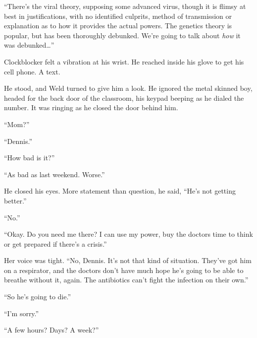 ``There's the viral theory, supposing some advanced virus, though it is flimsy at best in justifications, with no identified culprits, method of transmission or explanation as to how it provides the actual powers.  The genetics theory is popular, but has been thoroughly debunked.  We're going to talk about \emph{how} it was debunked\ldots''



Clockblocker felt a vibration at his wrist.  He reached inside his glove to get his cell phone.  A text.





He stood, and Weld turned to give him a look.  He ignored the metal skinned boy, headed for the back door of the classroom, his keypad beeping as he dialed the number.  It was ringing as he closed the door behind him.



``Mom?''



``Dennis.''



``How bad is it?''



``As bad as last weekend.  Worse.''



He closed his eyes.  More statement than question, he said, ``He's not getting better.''



``No.''



``Okay.  Do you need me there?  I can use my power, buy the doctors time to think or get prepared if there's a crisis.''



Her voice was tight.  ``No, Dennis.  It's not that kind of situation.  They've got him on a respirator, and the doctors don't have much hope he's going to be able to breathe without it, again.  The antibiotics can't fight the infection on their own.''



``So he's going to die.''



``I'm sorry.''



``A few hours?  Days?  A week?''



